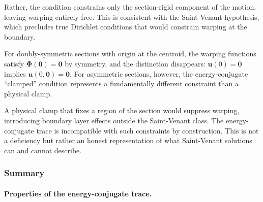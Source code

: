 Rather, the condition constrains only the section-rigid component of the 
motion, leaving warping entirely free. This is consistent with the 
Saint-Venant hypothesis, which precludes true Dirichlet conditions that 
would constrain warping at the boundary.

For doubly-symmetric sections with origin at the centroid, the warping 
functions satisfy $\bm{\Phi}(\mathbf{0}) = \mathbf{0}$ by symmetry, and the 
distinction disappears: $\bm{u}(0) = \mathbf{0}$ implies $\hat{\bm{u}}(0, \mathbf{0}) = \mathbf{0}$.
For asymmetric sections, however, the energy-conjugate ``clamped'' condition 
represents a fundamentally different constraint than a physical clamp.

\begin{remark}
A physical clamp that fixes a region of the section would suppress warping, 
introducing boundary layer effects outside the Saint-Venant class. The 
energy-conjugate trace is incompatible with such constraints by construction. 
This is not a deficiency but rather an honest representation of what 
Saint-Venant solutions can and cannot describe.
\end{remark}

\subsubsection{Summary}

\paragraph{Properties of the energy-conjugate trace.}

